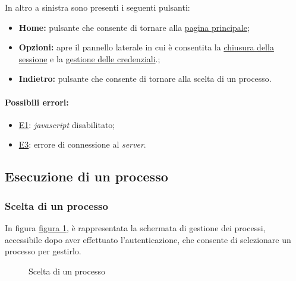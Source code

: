 In altro a sinistra sono presenti i seguenti pulsanti:
\begin{itemize}
\item \textbf{Home:} pulsante che consente di tornare alla \hyperref[home]{pagina principale};
\item \textbf{Opzioni:} apre il pannello laterale in cui è consentita la \hyperref[logout]{chiusura della sessione} e la \hyperref[userdata]{gestione delle credenziali}.;
\item \textbf{Indietro:} pulsante che consente di tornare alla scelta di un processo.
\end{itemize}

\paragraph*{Possibili errori:}
\begin{itemize}
\item \hyperref[e1]{E1}: \textit{javascript} disabilitato;
\item \hyperref[e3]{E3}: errore di connessione al \textit{server}.
\end{itemize}

\subsection{Esecuzione di un processo}
\label{gestione}

\subsubsection{Scelta di un processo}

In figura \hyperref[fig:Fprocesses]{figura \ref{fig:Fprocesses}}, è rappresentata la schermata di gestione dei processi, accessibile dopo aver effettuato l'autenticazione, che consente di selezionare un processo per gestirlo.

\begin{figure}[H] \centering 
{} \caption{Scelta di un processo}
\label{fig:Fprocesses}
\end{figure}

